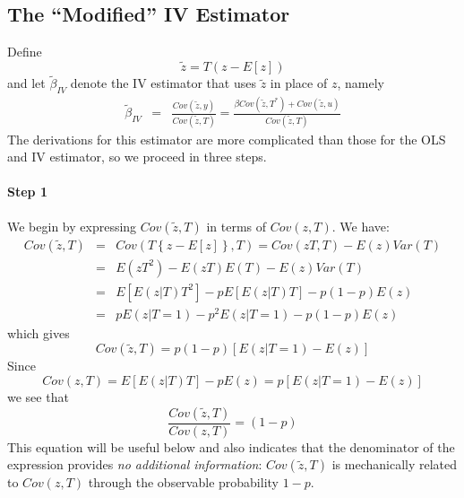 \subsection{The ``Modified'' IV Estimator}
Define 
\begin{equation}
\widetilde{z} = T(z - E[z])
  \label{eq:Ztilde}
\end{equation}
and let $\widetilde{\beta}_{IV}$ denote the IV estimator that uses $\widetilde{z}$ in place of $z$, namely
\begin{eqnarray*}
  \widetilde{\beta}_{IV} &=& \frac{Cov(\widetilde{z},y)}{Cov\left( \widetilde{z},T \right)} = \frac{\beta Cov(\widetilde{z},T^*) + Cov(\widetilde{z},u)}{Cov(\widetilde{z},T)}
\end{eqnarray*}
The derivations for this estimator are more complicated than those for the OLS and IV estimator, so we proceed in three steps.

\paragraph{Step 1}
We begin by expressing $Cov(\widetilde{z},T)$ in terms of $Cov(z,T)$.
We have:
\begin{eqnarray*}
  Cov(\widetilde{z},T) &=& Cov\left( T\left\{ z- E[z] \right\}, T \right) = Cov(zT,T) - E(z)Var(T)\\
  &=& E(zT^2) - E(zT)E(T) - E(z)Var(T) \\
  &=& E[E(z|T)T^2] - pE[E(z|T)T] - p(1-p)E(z) \\
  &=& pE(z|T=1) - p^2 E(z|T=1) - p(1-p)E(z)
\end{eqnarray*}
which gives
\begin{equation}
  Cov(\widetilde{z},T)= p(1-p)\left[ E(z|T=1) - E(z) \right]
  \label{eq:CovZtildeT}
\end{equation}
Since
\begin{equation}
  Cov(z,T) =   E\left[ E(z|T)T \right] - pE(z) =  p\left[ E(z|T=1) - E\left( z \right) \right]
  \label{eq:CovZT}
\end{equation}
we see that
\begin{equation}
  \frac{Cov(\widetilde{z},T)}{Cov(z,T)} = (1-p)
  \label{eq:ratioCovZT}
\end{equation}
This equation will be useful below and also indicates that the denominator of the expression provides \emph{no additional information}: $Cov(\widetilde{z},T)$ is mechanically related to $Cov(z,T)$ through the observable probability $1-p$.

